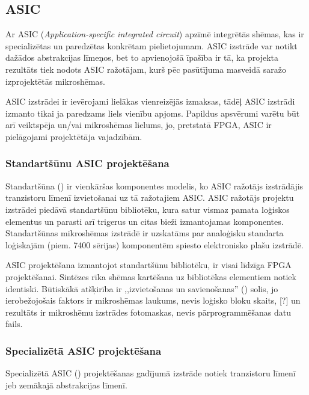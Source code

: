 	
\subsection{ASIC}
	Ar ASIC (\textit{Application-specific integrated circuit}) apzīmē
	integrētās shēmas, kas ir specializētas un paredzētas konkrētam
	pielietojumam. ASIC izstrāde var notikt dažādos abstrakcijas līmeņos,
	bet to apvienojošā īpašība ir tā, ka projekta rezultāts tiek nodots
	ASIC ražotājam, kurš pēc pasūtījuma 
	masveidā saražo izprojektētās mikroshēmas.
	
	ASIC izstrādei ir ievērojami lielākas vienreizējās izmaksas, tādēļ ASIC
	izstrādi izmanto tikai ja paredzams liels vienību apjoms. Papildus
	apsvērumi varētu būt arī veiktspēja un/vai mikroshēmas lielums, jo,
	pretstatā FPGA, ASIC ir pielāgojami projektētāja vajadzībām.
	
	\subsubsection*{Standartšūnu ASIC projektēšana}
		Standartšūna () ir vienkāršas komponentes
		modelis, ko ASIC ražotājs izstrādājis tranzistoru līmenī
		izvietošanai uz tā ražotajiem ASIC. ASIC ražotājs projektu
		izstrādei piedāvā standartšūnu bibliotēku, kura satur vismaz pamata
		loģiskos elementus un parasti arī trigerus un citas bieži
		izmantojamas komponentes. Standartšūnas mikroshēmas izstrādē ir
		uzskatāms par analoģisku standarta loģiskajām (piem. 7400 sērijas)
		komponentēm spiesto elektronisko plašu izstrādē.
	
		ASIC projektēšana izmantojot standartšūnu bibliotēku, ir visai
		līdzīga FPGA projektēšanai. Sintēzes rīka shēmas kartēšana uz
		bibliotēkas elementiem notiek identiski. Būtiskākā atšķirība
		ir ,,izvietošanas un savienošanas'' () solis,
		jo ierobežojošais faktors ir mikroshēmas laukums, nevis
		loģisko bloku skaits, [\todo{}?] un rezultāts ir 
		mikroshēmu izstrādes fotomaskas, nevis
		pārprogrammēšanas datu fails.
	
	\subsubsection*{Specializētā ASIC projektēšana}
		Specializētā ASIC () projektēšanas gadījumā
		izstrāde notiek tranzistoru līmenī jeb zemākajā abstrakcijas
		līmenī. \todo
		
		
